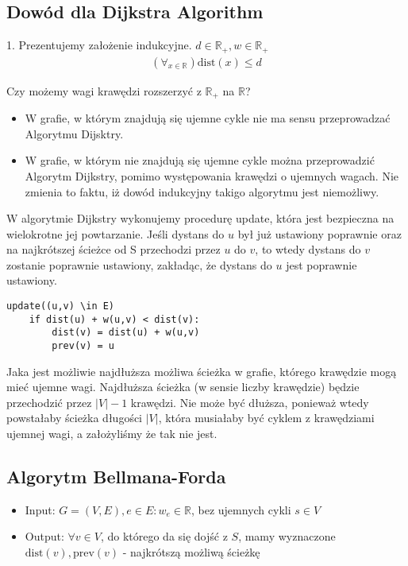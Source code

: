 \documentclass{article}
\numberwithin{equation}{subsection}
\begin{document}
\subsection{Dowód dla Dijkstra Algorithm}

1. Prezentujemy założenie indukcyjne. $d\in \mathbb{R}_{+}, w \in \mathbb{R}_{+}$
\begin{align} 
    \left(\forall_{x\in\mathbb{R}}\right) \text{dist}(x) \leq d
\end{align}

\noindent
Czy możemy wagi krawędzi rozszerzyć z $\mathbb{R}_{+}$ na $\mathbb{R}$?

\begin{itemize}
    \item W grafie, w którym znajdują się ujemne cykle nie ma sensu przeprowadzać Algorytmu Dijsktry.
    \item W grafie, w którym nie znajdują się ujemne cykle można przeprowadzić Algorytm Dijkstry, pomimo występowania krawędzi o ujemnych wagach. Nie zmienia to faktu, iż dowód indukcyjny takigo algorytmu jest niemożliwy.
\end{itemize}

W algorytmie Dijkstry wykonujemy procedurę update, która jest bezpieczna na wielokrotne jej powtarzanie.
Jeśli dystans do $u$ był już ustawiony poprawnie oraz na najkrótszej ścieżce od S przechodzi przez $u$ do $v$, 
to wtedy dystans do $v$ zostanie poprawnie ustawiony, zakładąc, że dystans do $u$ jest poprawnie ustawiony.

\begin{verbatim}
update((u,v) \in E)
    if dist(u) + w(u,v) < dist(v):
        dist(v) = dist(u) + w(u,v)
        prev(v) = u
\end{verbatim}

Jaka jest możliwie najdłuższa możliwa ścieżka w grafie, którego krawędzie mogą mieć ujemne wagi.
Najdłuższa ścieżka (w sensie liczby krawędzie) będzie przechodzić przez $|V|-1$ krawędzi.
Nie może być dłuższa, ponieważ wtedy powstałaby ścieżka długości $|V|$, która musiałaby być cyklem z krawędziami ujemnej wagi, a założyliśmy że tak nie jest.

\subsection{Algorytm Bellmana-Forda}

\begin{itemize}
    \item Input: $G=(V,E), e\in E: w_e \in \mathbb{R}$, bez ujemnych cykli $s\in V$
    \item Output: $\forall v\in V$, do którego da się dojść z $S$, mamy wyznaczone $\text{dist}(v),\text{prev}(v)$ - najkrótszą możliwą ścieżkę
\end{itemize}
\end{document}
